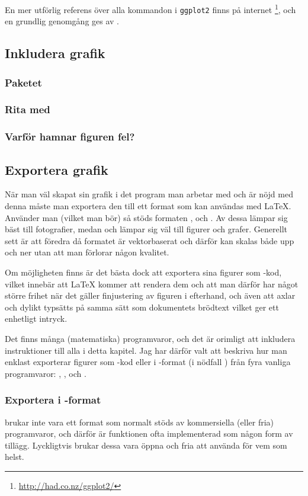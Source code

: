 \documentclass[../../a4.tex]{subfiles}
\begin{document}
En mer utförlig referens över alla kommandon i \texttt{ggplot2} finns på internet%
\footnote{\url{http://had.co.nz/ggplot2/}}, och en grundlig genomgång ges av
.

\subsection{Inkludera grafik}
\subsubsection{Paketet }
\subsubsection{Rita med \PGFTikZ}
\subsubsection{Varför hamnar figuren fel?}

\subsection{Exportera grafik}
När man väl skapat sin grafik i det program man arbetar med och är nöjd
med denna måste man exportera den till ett format som kan användas med
\LaTeX. Använder man \pdfLaTeX (vilket man bör) så stöds formaten \JPEG,
\PNG och \PDF. Av dessa lämpar sig \JPEG bäst till fotografier, medan
\PNG och \PDF lämpar sig väl till figurer och grafer.
Generellt sett är \PDF att föredra då formatet är vektorbaserat och
därför kan skalas både upp och ner utan att man förlorar någon kvalitet.

Om möjligheten finns är det bästa dock att exportera sina figurer som
\PGFTikZ-kod, vilket innebär att \LaTeX{} kommer att rendera dem och att
man därför har något större frihet när det gäller finjustering av figuren
i efterhand, och även att axlar och dylikt typsätts på samma sätt som
dokumentets brödtext vilket ger ett enhetligt intryck.

Det finns många (matematiska) programvaror, och det är orimligt att
inkludera instruktioner till alla i detta kapitel. Jag har därför valt
att beskriva hur man enklast exporterar figurer som \PGFTikZ-kod eller
i \PDF-format (i nödfall \PNG) från fyra vanliga programvaror:
\Rlogo, \MATLAB, \Mathematica och \gnuplot.

\subsubsection{Exportera i \PGFTikZ-format}
\PGFTikZ brukar inte vara ett format som normalt stöds av kommersiella
(eller fria) programvaror, och därför är funktionen ofta implementerad
som någon form av tillägg. Lyckligtvis brukar dessa vara öppna och fria
att använda för vem som helst.
\end{document}
